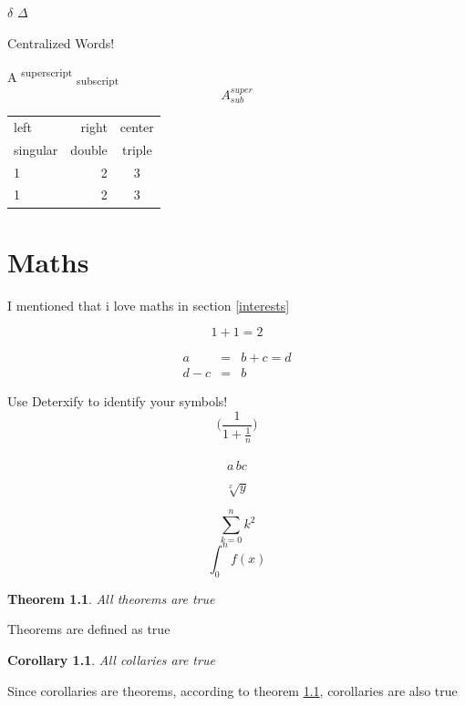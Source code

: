 \documentclass[a4paper]{report}
\begin{document}
$\delta$ $\Delta$ %
\\

\begin{center}
{\small Centralized Words! \\}

A \textsuperscript{superscript} \textsubscript{subscript} 
$$A^{super}_{sub}$$
\end{center}

\begin{tabular}{|l|r|c|}
\hline
left & right & center \\
singular & double & triple \\
\hline
1 & 2 & 3\\
\cline{2-3}
1 & 2 & 3\\
\cline{3-3}
\end{tabular}

\newpage
\chapter{Maths}
I mentioned that i love maths in section \ref{interests}

\begin{equation}
1+1=2
\end{equation}

\begin{eqnarray*}
a & = & b + c = d\\
d -c & = & b
\end{eqnarray*}

\noindent
Use Deterxify to identify your symbols! \\

$$\biggl(\frac{1}{1+\frac{1}{n}}\biggl)$$ \\

\[ a\,b\!c \] \cite{MIT}

$$\sqrt[x]{y}$$

$$ \sum_{k=0}^n k^2$$
$$ \int_{0}^n f(x)$$


\newtheorem{theorem}{Theorem}
\newtheorem{corollary}{Corollary}[section]
\begin{theorem}
\label{truth}
All theorems are true
\end{theorem}
Theorems are defined as true
\begin{corollary}
All collaries are true
\end{corollary}
Since corollaries are theorems, according to theorem \ref{truth}, corollaries are also true\\
\end{document}
